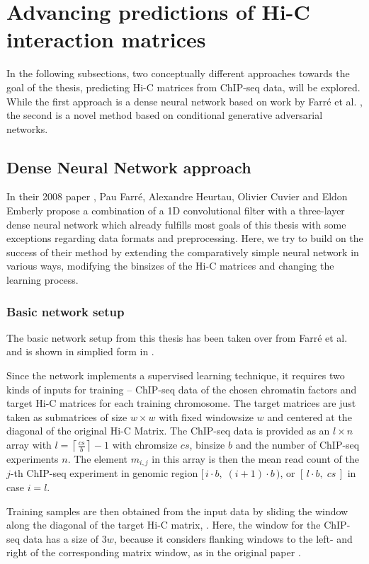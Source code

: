 \section{Advancing predictions of Hi-C interaction matrices}
In the following subsections, two conceptually different approaches towards the goal of the thesis,
predicting Hi-C matrices from ChIP-seq data, will be explored.
While the first approach is a dense neural network based on work by Farr\'e et al. \cite{Farre2018a},
the second is a novel method based on conditional generative adversarial networks.

\subsection{Dense Neural Network approach}\label{sec:DNNapproach}
In their 2008 paper \cite{Farre2018a}, Pau Farr\'e, Alexandre Heurtau, Olivier Cuvier and Eldon Emberly
propose a combination of a 1D convolutional filter with a three-layer dense neural network 
which already fulfills most goals of this thesis with some exceptions regarding data formats and preprocessing.
Here, we try to build on the success of their method by extending the comparatively simple neural network
in various ways, modifying the binsizes of the Hi-C matrices and changing the learning process.

\subsubsection{Basic network setup}
The basic network setup from this thesis has been taken over from Farr\'e et al. \cite{Farre2018a}
and is shown in simplied form in \xxx.

Since the network implements a supervised learning technique,
it requires two kinds of inputs for training -- ChIP-seq data of the chosen chromatin factors and
target Hi-C matrices for each training chromosome.
The target matrices are just taken as submatrices of size $w \times w$ 
with fixed windowsize $w$ and centered at the diagonal of the 
original Hi-C Matrix.
The ChIP-seq data is provided as an $l\times n$ array with $l=\left \lceil{\frac{cs}{b}}\right \rceil -1$
with chromsize $cs$, binsize $b$ and the number of ChIP-seq experiments $n$. 
The element $m_{i,j}$ in this array is then the mean read count
of the $j$-th ChIP-seq experiment in genomic region $[\,i\cdot b, \; (i+1)\cdot b \,)$, or $[\,l\cdot b,\; cs\,]$ in case $i = l$.

Training samples are then obtained from the input data by sliding 
the window along the diagonal of the target Hi-C matrix, \xxx.
Here, the window for the ChIP-seq data has a size of $3w$,
because it considers flanking windows to the left- and right of the 
corresponding matrix window, as in the original paper \cite{Farre2018a}.

